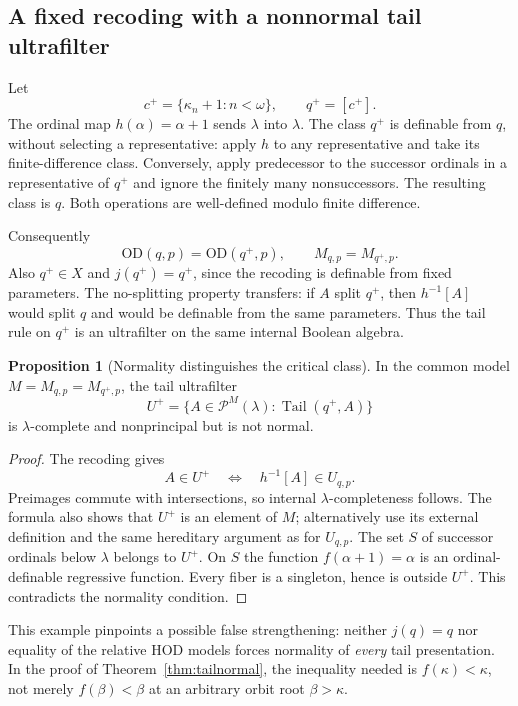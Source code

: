 \documentclass[11pt,letterpaper]{article}
\theoremstyle{definition}
\newtheorem{proposition}[definition]{Proposition}
\numberwithin{equation}{section}
\newcommand{\OD}{\mathrm{OD}}
\newcommand{\Pow}{\mathcal P}
\newcommand{\Tail}{\operatorname{Tail}}
\begin{document}
\subsection{A fixed recoding with a nonnormal tail ultrafilter}

Let
\[
 c^+=\{\kappa_n+1:n<\omega\},\qquad q^+=[c^+].
\]
The ordinal map $h(\alpha)=\alpha+1$ sends $\lambda$ into $\lambda$.
The class $q^+$ is definable from $q$, without selecting a
representative: apply $h$ to any representative and take its
finite-difference class. Conversely, apply predecessor to the
successor ordinals in a representative of $q^+$ and ignore the
finitely many nonsuccessors. The resulting class is $q$.
Both operations are well-defined modulo finite difference.

Consequently
\begin{equation}\label{eq:recodehod}
 \OD(q,p)=\OD(q^+,p),\qquad M_{q,p}=M_{q^+,p}.
\end{equation}
Also $q^+\in X$ and $j(q^+)=q^+$, since the recoding is definable from
fixed parameters. The no-splitting property transfers: if $A$ split
$q^+$, then $h^{-1}[A]$ would split $q$ and would be definable from the
same parameters. Thus the tail rule on $q^+$ is an ultrafilter on the
same internal Boolean algebra.

\begin{proposition}[Normality distinguishes the critical class]\label{prop:shift}
In the common model $M=M_{q,p}=M_{q^+,p}$, the tail ultrafilter
\[
 U^+=\{A\in\Pow^M(\lambda):\Tail(q^+,A)\}
\]
is $\lambda$-complete and nonprincipal but is not normal.
\end{proposition}

\begin{proof}
The recoding gives
\[
 A\in U^+\quad\Longleftrightarrow\quad h^{-1}[A]\in U_{q,p}.
\]
Preimages commute with intersections, so internal
$\lambda$-completeness follows. The formula also shows that $U^+$ is
an element of $M$; alternatively use its external definition and the
same hereditary argument as for $U_{q,p}$.
The set $S$ of successor ordinals below $\lambda$ belongs to $U^+$.
On $S$ the function $f(\alpha+1)=\alpha$ is an ordinal-definable
regressive function. Every fiber is a singleton, hence is outside
$U^+$. This contradicts the normality condition.
\end{proof}

This example pinpoints a possible false strengthening: neither
$j(q)=q$ nor equality of the relative HOD models forces normality of
\emph{every} tail presentation. In the proof of
Theorem~\ref{thm:tailnormal}, the inequality needed is
$f(\kappa)<\kappa$, not merely $f(\beta)<\beta$ at an arbitrary orbit
root $\beta>\kappa$.
\end{document}
